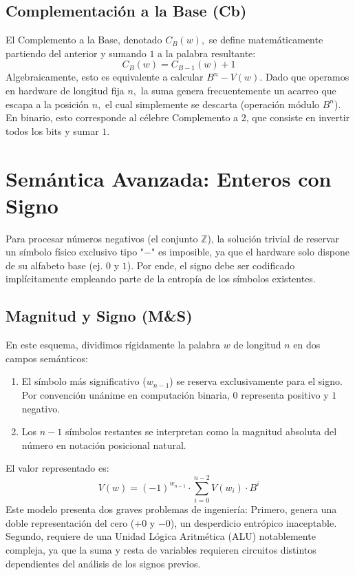 \subsection{Complementación a la Base (Cb)}
El Complemento a la Base, denotado $C_B(w),$ se define matemáticamente partiendo del anterior y sumando $1$ a la palabra resultante:
\[ C_B(w) = C_{B-1}(w) + 1 \]
Algebraicamente, esto es equivalente a calcular $B^n - V(w).$ Dado que operamos en hardware de longitud fija $n,$ la suma genera frecuentemente un acarreo que escapa a la posición $n,$ el cual simplemente se descarta (operación módulo $B^n$).
En binario, esto corresponde al célebre Complemento a 2, que consiste en invertir todos los bits y sumar $1.$

\section{Semántica Avanzada: Enteros con Signo}

Para procesar números negativos (el conjunto $\mathbb{Z}$), la solución trivial de reservar un símbolo físico exclusivo tipo "$-$" es imposible, ya que el hardware solo dispone de su alfabeto base (ej. $0$ y $1$). Por ende, el signo debe ser codificado implícitamente empleando parte de la entropía de los símbolos existentes.

\subsection{Magnitud y Signo (M\&S)}
En este esquema, dividimos rígidamente la palabra $w$ de longitud $n$ en dos campos semánticos:
\begin{enumerate}
    \item El símbolo más significativo ($w_{n-1}$) se reserva exclusivamente para el signo. Por convención unánime en computación binaria, $0$ representa positivo y $1$ negativo.
    \item Los $n-1$ símbolos restantes se interpretan como la magnitud absoluta del número en notación posicional natural.
\end{enumerate}
El valor representado es:
\[ V(w) = (-1)^{w_{n-1}} \cdot \sum_{i=0}^{n-2} V(w_i) \cdot B^i \]
Este modelo presenta dos graves problemas de ingeniería: 
Primero, genera una doble representación del cero ($+0$ y $-0$), un desperdicio entrópico inaceptable.
Segundo, requiere de una Unidad Lógica Aritmética (ALU) notablemente compleja, ya que la suma y resta de variables requieren circuitos distintos dependientes del análisis de los signos previos.

